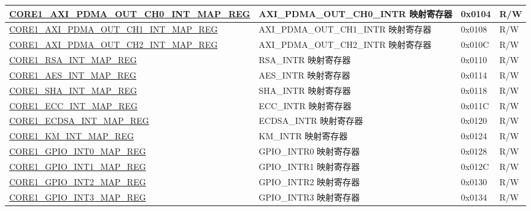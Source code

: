 \begin{longtable}{ | p{8.7cm} | p{6.2cm} | p{1.3cm} | p{1cm} | }
\hyperref[regdesc:CORE1AXIPDMAOUTCH0INTMAPREG]{CORE1\_AXI\_PDMA\_OUT\_CH0\_INT\_MAP\_REG} & AXI\_PDMA\_OUT\_CH0\_INTR 映射寄存器 & 0x0104 & R/W \\ \hline

\hyperref[regdesc:CORE1AXIPDMAOUTCH1INTMAPREG]{CORE1\_AXI\_PDMA\_OUT\_CH1\_INT\_MAP\_REG} & AXI\_PDMA\_OUT\_CH1\_INTR 映射寄存器 & 0x0108 & R/W \\ \hline

\hyperref[regdesc:CORE1AXIPDMAOUTCH2INTMAPREG]{CORE1\_AXI\_PDMA\_OUT\_CH2\_INT\_MAP\_REG} & AXI\_PDMA\_OUT\_CH2\_INTR 映射寄存器 & 0x010C & R/W \\ \hline

\hyperref[regdesc:CORE1RSAINTMAPREG]{CORE1\_RSA\_INT\_MAP\_REG} & RSA\_INTR 映射寄存器 & 0x0110 & R/W \\ \hline

\hyperref[regdesc:CORE1AESINTMAPREG]{CORE1\_AES\_INT\_MAP\_REG} & AES\_INTR 映射寄存器 & 0x0114 & R/W \\ \hline

\hyperref[regdesc:CORE1SHAINTMAPREG]{CORE1\_SHA\_INT\_MAP\_REG} & SHA\_INTR 映射寄存器 & 0x0118 & R/W \\ \hline

\hyperref[regdesc:CORE1ECCINTMAPREG]{CORE1\_ECC\_INT\_MAP\_REG} & ECC\_INTR 映射寄存器 & 0x011C & R/W \\ \hline

\hyperref[regdesc:CORE1ECDSAINTMAPREG]{CORE1\_ECDSA\_INT\_MAP\_REG} & ECDSA\_INTR 映射寄存器 & 0x0120 & R/W \\ \hline

\hyperref[regdesc:CORE1KMINTMAPREG]{CORE1\_KM\_INT\_MAP\_REG} & KM\_INTR 映射寄存器 & 0x0124 & R/W \\ \hline

\hyperref[regdesc:CORE1GPIOINT0MAPREG]{CORE1\_GPIO\_INT0\_MAP\_REG} & GPIO\_INTR0 映射寄存器 & 0x0128 & R/W \\ \hline

\hyperref[regdesc:CORE1GPIOINT1MAPREG]{CORE1\_GPIO\_INT1\_MAP\_REG} & GPIO\_INTR1 映射寄存器 & 0x012C & R/W \\ \hline

\hyperref[regdesc:CORE1GPIOINT2MAPREG]{CORE1\_GPIO\_INT2\_MAP\_REG} & GPIO\_INTR2 映射寄存器 & 0x0130 & R/W \\ \hline

\hyperref[regdesc:CORE1GPIOINT3MAPREG]{CORE1\_GPIO\_INT3\_MAP\_REG} & GPIO\_INTR3 映射寄存器 & 0x0134 & R/W \\ \hline


\end{longtable}
